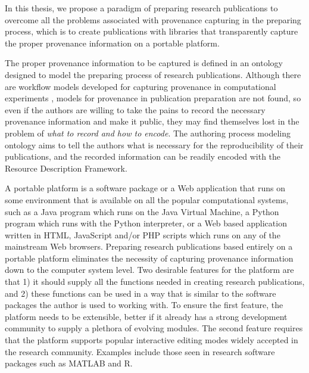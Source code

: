 In this thesis, we propose a paradigm of preparing research publications to overcome all the problems associated with provenance capturing in the preparing process, which is to create publications with libraries that transparently capture the proper provenance information on a portable platform.



The proper provenance information to be captured is defined in an ontology designed to model the preparing process of research publications. Although there are workflow models developed for capturing provenance in computational experiments \cite{groth2006architecture, groth2009recording}, models for provenance in publication preparation are not found, so even if the authors are willing to take the pains to record the necessary provenance information and make it public, they may find themselves lost in the problem of \emph{what to record and how to encode}. The authoring process modeling ontology aims to tell the authors what is necessary for the reproducibility of their publications, and the recorded information can be readily encoded with the Resource Description Framework.

A portable platform is a software package or a Web application that runs on some environment that is available on all the popular computational systems, such as a Java program which runs on the Java Virtual Machine, a Python program which runs with the Python interpreter, or a Web based application written in HTML, JavaScript and/or PHP scripts which runs on any of the mainstream Web browsers. Preparing research publications based entirely on a portable platform eliminates the necessity of capturing provenance information down to the computer system level. Two desirable features for the platform are that 1) it should supply all the functions needed in creating research publications, and 2) these functions can be used in a way that is similar to the software packages the author is used to working with. To ensure the first feature, the platform needs to be extensible, better if it already has a strong development community to supply a plethora of evolving modules. The second feature requires that the platform supports popular interactive editing modes widely accepted in the research community. Examples include those seen in research software packages such as MATLAB and R.

